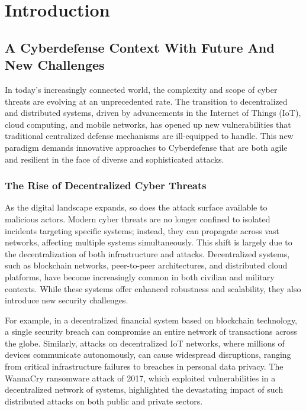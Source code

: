 \chapter{Introduction}\label{ch:introduction}

\section{A Cyberdefense Context With Future And New Challenges}

In today's increasingly connected world, the complexity and scope of cyber threats are evolving at an unprecedented rate. The transition to decentralized and distributed systems, driven by advancements in the Internet of Things (IoT), cloud computing, and mobile networks, has opened up new vulnerabilities that traditional centralized defense mechanisms are ill-equipped to handle. This new paradigm demands innovative approaches to Cyberdefense that are both agile and resilient in the face of diverse and sophisticated attacks.

\subsection{The Rise of Decentralized Cyber Threats}

As the digital landscape expands, so does the attack surface available to malicious actors. Modern cyber threats are no longer confined to isolated incidents targeting specific systems; instead, they can propagate across vast networks, affecting multiple systems simultaneously. This shift is largely due to the decentralization of both infrastructure and attacks. Decentralized systems, such as blockchain networks, peer-to-peer architectures, and distributed cloud platforms, have become increasingly common in both civilian and military contexts. While these systems offer enhanced robustness and scalability, they also introduce new security challenges.

For example, in a decentralized financial system based on blockchain technology, a single security breach can compromise an entire network of transactions across the globe. Similarly, attacks on decentralized IoT networks, where millions of devices communicate autonomously, can cause widespread disruptions, ranging from critical infrastructure failures to breaches in personal data privacy. The WannaCry ransomware attack of 2017, which exploited vulnerabilities in a decentralized network of systems, highlighted the devastating impact of such distributed attacks on both public and private sectors.

